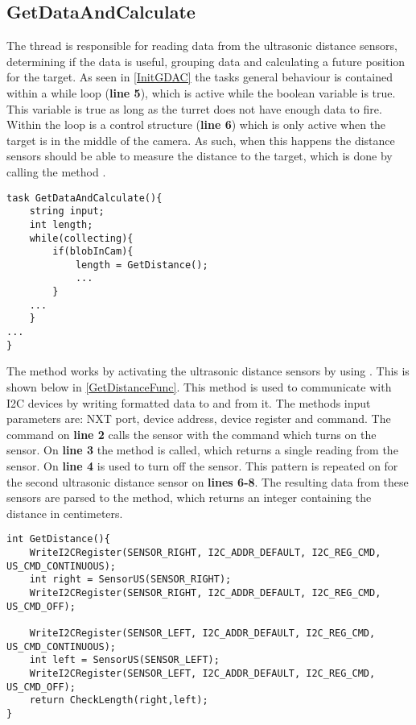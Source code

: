 \subsection{GetDataAndCalculate}\label{GetDataAndCalc}
The thread  is responsible for reading data
from the ultrasonic distance sensors, determining if the data is useful,
grouping data and calculating a future position for the target. As seen in
\autoref{InitGDAC} the tasks general behaviour is contained within a while loop
(\textbf{line 5}), which is active while the boolean variable
 is true. This variable is true as long as the
turret does not have enough data to fire. Within the loop is a control structure
(\textbf{line 6}) which is only active when the target is in the middle of the
camera. As such, when this happens the distance sensors should be able to
measure the distance to the target, which is done by calling the method
.\nl

\begin{minipage}[H]{\linewidth}
\begin{lstlisting}[caption = General behaviour for GetDataAndCalculate, label = InitGDAC] 
task GetDataAndCalculate(){
    string input;
    int length;
    while(collecting){
        if(blobInCam){
            length = GetDistance();
            ...
        }
    ...
    }
...
}
\end{lstlisting}
\end{minipage}

The  method works by activating the ultrasonic distance
sensors by using . This is shown below in
\autoref{GetDistanceFunc}. This method is used to communicate with I2C devices
by writing formatted data to and from it. The methods input parameters are: NXT
port, device address, device register and command. The command on \textbf{line
2} calls the sensor with the command  which turns on
the sensor. On \textbf{line 3} the  method is called, which
returns a single reading from the sensor. On \textbf{line 4}
 is used to turn off the sensor. This pattern is repeated on
for the second ultrasonic distance sensor on \textbf{lines 6-8}. The resulting
data from these sensors are parsed to the  method, which
returns an integer containing the distance in centimeters.\nl

\begin{minipage}[H]{\linewidth}
\begin{lstlisting}[caption = Method for reading the distance from the ultrasonic distance sensors., label = GetDistanceFunc] 
int GetDistance(){
    WriteI2CRegister(SENSOR_RIGHT, I2C_ADDR_DEFAULT, I2C_REG_CMD, US_CMD_CONTINUOUS);
    int right = SensorUS(SENSOR_RIGHT);
    WriteI2CRegister(SENSOR_RIGHT, I2C_ADDR_DEFAULT, I2C_REG_CMD, US_CMD_OFF);

    WriteI2CRegister(SENSOR_LEFT, I2C_ADDR_DEFAULT, I2C_REG_CMD, US_CMD_CONTINUOUS);
    int left = SensorUS(SENSOR_LEFT);
    WriteI2CRegister(SENSOR_LEFT, I2C_ADDR_DEFAULT, I2C_REG_CMD, US_CMD_OFF);
    return CheckLength(right,left);
}
\end{lstlisting}
\end{minipage}

